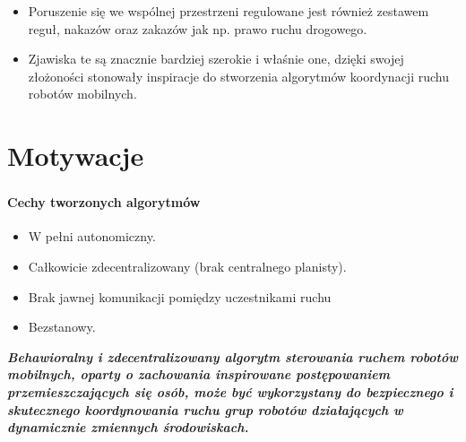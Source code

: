 \documentclass{beamer}
\begin{document}
\begin{frame}
{\begin{itemize}
	\item Poruszenie się we wspólnej przestrzeni regulowane jest również zestawem reguł, nakazów oraz zakazów jak np. prawo ruchu drogowego.
	
	\item Zjawiska te są znacznie bardziej szerokie i właśnie one, dzięki swojej złożoności stonowały inspiracje do stworzenia algorytmów koordynacji ruchu robotów mobilnych.
\end{itemize}
}

\end{frame}

\section*{Motywacje}
\begin{frame}
\frametitle{\secname}
\framesubtitle{Cechy tworzonych algorytmów}

\begin{itemize}
	\item W pełni autonomiczny.
	\item Całkowicie zdecentralizowany (brak centralnego planisty).
	\item Brak jawnej komunikacji pomiędzy uczestnikami ruchu
	\item Bezstanowy.
\end{itemize}


\begin{center}
	\textbf{\textit{Behawioralny i zdecentralizowany algorytm sterowania ruchem robotów mobilnych, oparty o zachowania inspirowane postępowaniem przemieszczających się osób, może być wykorzystany do bezpiecznego i skutecznego koordynowania ruchu grup robotów działających w dynamicznie zmiennych środowiskach.}}
\end{center}


\end{frame}
\end{document}
